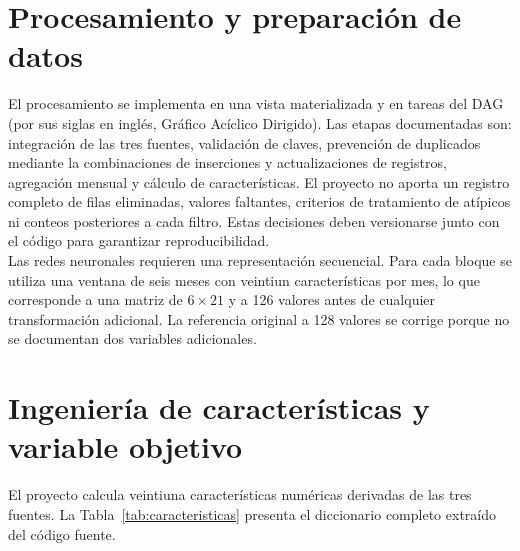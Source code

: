 \section{Procesamiento y preparación de datos}

El procesamiento se implementa en una vista materializada y en tareas del DAG (por sus siglas en inglés, Gráfico Acíclico Dirigido). Las etapas documentadas son: integración de las tres fuentes, validación de claves, prevención de duplicados mediante la combinaciones de inserciones y actualizaciones de registros, agregación mensual y cálculo de características. El proyecto no aporta un registro completo de filas eliminadas, valores faltantes, criterios de tratamiento de atípicos ni conteos posteriores a cada filtro. Estas decisiones deben versionarse junto con el código para garantizar reproducibilidad.\\

Las redes neuronales requieren una representación secuencial. Para cada bloque se utiliza una ventana de seis meses con veintiun características por mes, lo que corresponde a una matriz de $6 \times 21$ y a 126 valores antes de cualquier transformación adicional. La referencia original a 128 valores se corrige porque no se documentan dos variables adicionales.

\section{Ingeniería de características y variable objetivo}

El proyecto calcula veintiuna características numéricas derivadas de las tres fuentes. La Tabla~\ref{tab:caracteristicas} presenta el diccionario completo extraído del código fuente.

